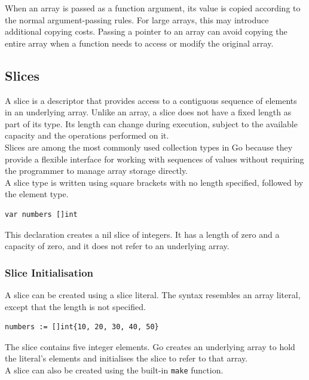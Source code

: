 When an array is passed as a function argument, its value is copied according to the normal argument-passing rules. For large arrays, this may introduce additional copying costs. Passing a pointer to an array can avoid copying the entire array when a function needs to access or modify the original array.

\subsection{Slices}

A slice is a descriptor that provides access to a contiguous sequence of elements in an underlying array. Unlike an array, a slice does not have a fixed length as part of its type. Its length can change during execution, subject to the available capacity and the operations performed on it.\\

Slices are among the most commonly used collection types in Go because they provide a flexible interface for working with sequences of values without requiring the programmer to manage array storage directly.\\

A slice type is written using square brackets with no length specified, followed by the element type.

\begin{lstlisting}
var numbers []int
\end{lstlisting}

This declaration creates a nil slice of integers. It has a length of zero and a capacity of zero, and it does not refer to an underlying array.

\subsubsection{Slice Initialisation}

A slice can be created using a slice literal. The syntax resembles an array literal, except that the length is not specified.

\begin{lstlisting}
numbers := []int{10, 20, 30, 40, 50}
\end{lstlisting}

The slice contains five integer elements. Go creates an underlying array to hold the literal's elements and initialises the slice to refer to that array.\\

A slice can also be created using the built-in \texttt{make} function.

